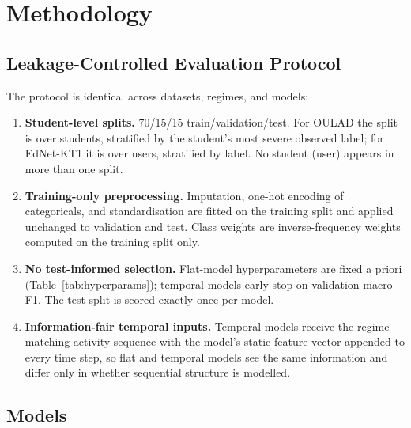 \documentclass[sn-mathphys,Numbered]{sn-jnl}
\begin{document}
\section{Methodology}\label{sec:method}

\subsection{Leakage-Controlled Evaluation Protocol}\label{sec:protocol}

The protocol is identical across datasets, regimes, and models:
\begin{enumerate}
  \item \textbf{Student-level splits.} 70/15/15 train/validation/test. For OULAD the split is over students, stratified by the student's most severe observed label; for EdNet-KT1 it is over users, stratified by label. No student (user) appears in more than one split.
  \item \textbf{Training-only preprocessing.} Imputation, one-hot encoding of categoricals, and standardisation are fitted on the training split and applied unchanged to validation and test. Class weights are inverse-frequency weights computed on the training split only.
  \item \textbf{No test-informed selection.} Flat-model hyperparameters are fixed a priori (Table~\ref{tab:hyperparams}); temporal models early-stop on validation macro-F1. The test split is scored exactly once per model.
  \item \textbf{Information-fair temporal inputs.} Temporal models receive the regime-matching activity sequence with the model's static feature vector appended to every time step, so flat and temporal models see the same information and differ only in whether sequential structure is modelled.
\end{enumerate}

\subsection{Models}\label{sec:models}
\end{document}
